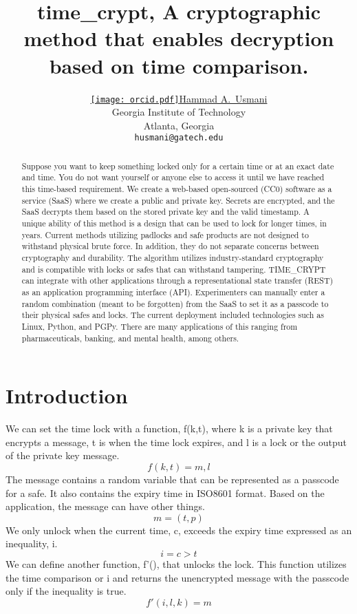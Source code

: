 \documentclass{article}
\title{time\_crypt, A cryptographic method that enables decryption based on time comparison.
}
\author{ \href{https://orcid.org/0000-0003-0472-253X}{\texttt{[image: orcid.pdf]}\hspace{1mm}Hammad A.~Usmani} \\
    Georgia Institute of Technology\\
    Atlanta, Georgia \\
    \texttt{husmani@gatech.edu} \\
}
\begin{document}
\maketitle


\begin{abstract}
Suppose you want to keep something locked only for a certain time or at an exact date and time. You do not want yourself or anyone else to access it until we have reached this time-based requirement. We create a web-based open-sourced (CC0) software as a service (SaaS) where we create a public and private key. Secrets are encrypted, and the SaaS decrypts them based on the stored private key and the valid timestamp. A unique ability of this method is a design that can be used to lock for longer times, in years. Current methods utilizing padlocks and safe products are not designed to withstand physical brute force. In addition, they do not separate concerns between cryptography and durability. The algorithm utilizes industry-standard cryptography and is compatible with locks or safes that can withstand tampering. TIME\_CRYPT can integrate with other applications through a representational state transfer (REST) as an application programming interface (API). Experimenters can manually enter a random combination (meant to be forgotten) from the SaaS to set it as a passcode to their physical safes and locks. The current deployment included technologies such as Linux, Python, and PGPy. There are many applications of this ranging from pharmaceuticals, banking, and mental health, among others. 
\end{abstract}




\section{Introduction}
We can set the time lock with a function, f(k,t), where k is a private key that encrypts a message, t is when the time lock expires, and l is a lock or the output of the private key message.
\begin{equation}
    f(k, t) = m, l
\end{equation}
The message contains a random variable that can be represented as a passcode for a safe. It also contains the expiry time in ISO8601 format. Based on the application, the message can have other things.
\begin{equation}
    m = (t, p)
\end{equation}
We only unlock when the current time, c, exceeds the expiry time expressed as an inequality, i.
\begin{equation}
    i = c > t
\end{equation}
We can define another function, f'(), that unlocks the lock. This function utilizes the time comparison or i and returns the unencrypted message with the passcode only if the inequality is true.
\begin{equation}
    f'(i, l, k) = m
\end{equation}
\end{document}
